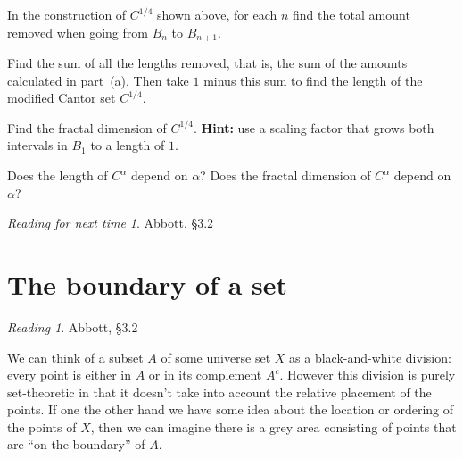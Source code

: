 \documentclass[11pt,oneside]{amsbook}
\theoremstyle{definition}
\theoremstyle{plain}
\theoremstyle{definition}
\theoremstyle{remark}
\newtheorem*{reading}{Reading}
\newtheorem*{readnext}{Reading for next time}
\numberwithin{equation}{section}
\numberwithin{figure}{section}
\newcounter{activityitem}
\newenvironment{activity}{\begin{list}{\arabic{activityitem}.}{\usecounter{activityitem}\setlength{\itemsep}{.2in}}}{\end{list}}
\begin{document}
\begin{center}
\end{center}

\begin{activity}
  \item In the construction of $C^{1/4}$ shown above, for each $n$ find the total amount removed when going from $B_n$ to $B_{n+1}$.
  \vspace{\fill}
  \item Find the sum of all the lengths removed, that is, the sum of the amounts calculated in part~(a). Then take $1$ minus this sum to find the length of the modified Cantor set $C^{1/4}$.
  \vspace{\fill}
  \item Find the fractal dimension of $C^{1/4}$. \textbf{Hint:} use a scaling factor that grows both intervals in $B_1$ to a length of $1$.
  \vspace{\fill}
  \item Does the length of $C^\alpha$ depend on $\alpha$? Does the fractal dimension of $C^\alpha$ depend on $\alpha$?
\end{activity}

\begin{readnext}
  Abbott, \S 3.2
\end{readnext}


\newpage
\section{The boundary of a set}

\begin{reading}
  Abbott, \S 3.2
\end{reading}

We can think of a subset $A$ of some universe set $X$ as a black-and-white division: every point is either in $A$ or in its complement $A^c$. However this division is purely set-theoretic in that it doesn't take into account the relative placement of the points. If one the other hand we have some idea about the location or ordering of the points of $X$, then we can imagine there is a grey area consisting of points that are ``on the boundary'' of $A$.
\end{document}

